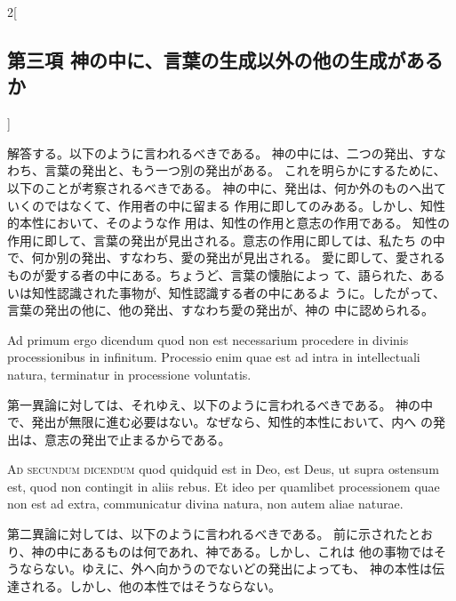 \documentclass[paper=a4paper,fontsize=10pt,jafontsize=9pt,titlepage]{jlreq}
\begin{document}
\begin{paracol}{2}[\subsection{第三項 神の中に、言葉の生成以外の他の生成があるか}]
\switchcolumn


解答する。以下のように言われるべきである。
神の中には、二つの発出、すなわち、言葉の発出と、もう一つ別の発出がある。
これを明らかにするために、以下のことが考察されるべきである。
神の中に、発出は、何か外のものへ出ていくのではなくて、作用者の中に留まる
 作用に即してのみある。しかし、知性的本性において、そのような作
 用は、知性の作用と意志の作用である。
知性の作用に即して、言葉の発出が見出される。意志の作用に即しては、私たち
 の中で、何か別の発出、すなわち、愛の発出が見出される。
愛に即して、愛されるものが愛する者の中にある。ちょうど、言葉の懐胎によっ
 て、語られた、あるいは知性認識された事物が、知性認識する者の中にあるよ
 うに。したがって、言葉の発出の他に、他の発出、すなわち愛の発出が、神の
 中に認められる。


\switchcolumn*[\subsection{ad.1}]


Ad primum ergo dicendum quod non est necessarium procedere in divinis
processionibus in infinitum. Processio enim quae est ad intra in
intellectuali natura, terminatur in processione voluntatis.


\switchcolumn


第一異論に対しては、それゆえ、以下のように言われるべきである。
神の中で、発出が無限に進む必要はない。なぜなら、知性的本性において、内へ
 の発出は、意志の発出で止まるからである。


\switchcolumn*[\subsection{ad.2}]


{\scshape Ad secundum dicendum} quod quidquid est in Deo, est Deus, ut supra
ostensum est, quod non contingit in aliis rebus. Et ideo per quamlibet
processionem quae non est ad extra, communicatur divina natura, non
autem aliae naturae.


\switchcolumn


第二異論に対しては、以下のように言われるべきである。
前に示されたとおり、神の中にあるものは何であれ、神である。しかし、これは
 他の事物ではそうならない。ゆえに、外へ向かうのでないどの発出によっても、
 神の本性は伝達される。しかし、他の本性ではそうならない。


\switchcolumn*[\subsection{ad.3}]



\end{paracol}
\end{document}
